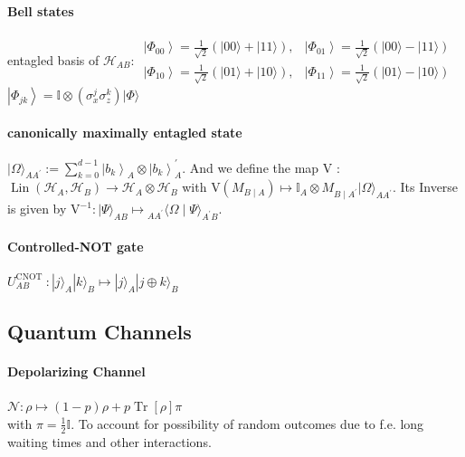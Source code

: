 \paragraph{Bell states} entagled basis of $\mathcal{H}_{A B}$: $\begin{array}{ll}
  \left|\Phi_{00}\right\rangle=\frac{1}{\sqrt{2}}(|00\rangle+|11\rangle), & \left|\Phi_{01}\right\rangle=\frac{1}{\sqrt{2}}(|00\rangle-|11\rangle) \\
  \left|\Phi_{10}\right\rangle=\frac{1}{\sqrt{2}}(|01\rangle+|10\rangle), & \left|\Phi_{11}\right\rangle=\frac{1}{\sqrt{2}}(|01\rangle-|10\rangle)
  \end{array}$ \\
  $\left|\Phi_{j k}\right\rangle=\mathbb{I} \otimes\left(\sigma_x^j \sigma_z^k\right)|\Phi\rangle$

\paragraph{canonically maximally entagled state} $|\Omega\rangle_{A A^{\prime}}:=\sum_{k=0}^{d-1}\left|b_k\right\rangle_A \otimes\left|b_k\right\rangle_A^\prime$.
And we define the map V : $\operatorname{Lin}\left(\mathcal{H}_A, \mathcal{H}_B\right) \rightarrow \mathcal{H}_A \otimes \mathcal{H}_B$
with $\mathrm{V}\left(M_{B \mid A}\right) \mapsto \mathbb{I}_A \otimes M_{B \mid A^{\prime}}|\Omega\rangle_{A A^{\prime}}$. 
Its Inverse is given by $\mathrm{V}^{-1}:|\Psi\rangle_{A B} \mapsto{ }_{A A^{\prime}}\langle\Omega \mid \Psi\rangle_{A^{\prime} B}$.

\paragraph{Controlled-NOT gate} $U_{A B}^{\text {CNOT }}:|j\rangle_A|k\rangle_B \mapsto|j\rangle_A|j \oplus k\rangle_B$

\subsection{Quantum Channels}

\paragraph{Depolarizing Channel}$\mathcal{N}: \rho \mapsto(1-p) \rho+p \operatorname{Tr}[\rho] \pi$\\
with $\pi=\frac{1}{2} \mathbb{I}$. To account for possibility of random outcomes due to f.e. long waiting times and other interactions.

